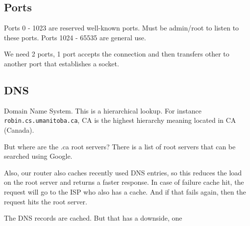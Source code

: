 \subsection{Ports}

Ports 0 - 1023 are reserved well-known ports. Must be admin/root to listen to these ports.
Ports 1024 - 65535 are general use.

We need 2 ports, 1 port accepts the connection and then transfers other to another port that establishes a socket.

\subsection{DNS}

Domain Name System. This is a hierarchical lookup. For instance \texttt{robin.cs.umanitoba.ca}, CA is the highest hierarchy meaning located in CA (Canada).
%

But where are the .ca root servers? There is a list of root servers that can be searched using Google.

Also, our router also caches recently used DNS entries, so this reduces the load on the root server and returns a faster response. In case of failure cache hit, the request will go to the ISP who also has a cache. And if that fails again, then the request hits the root server.

The DNS records are cached. But that has a downside, one
